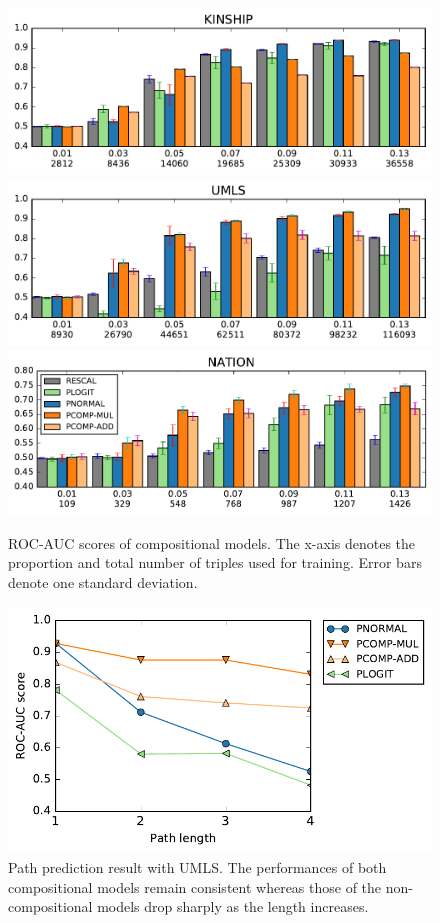 \begin{figure}[t]
	\centering
	\includegraphics[width=\linewidth]{images/comp_training_error_kinship_small.pdf}
	\includegraphics[width=\linewidth]{images/comp_training_error_umls_small.pdf}
	\includegraphics[width=\linewidth]{images/comp_training_error_nation_small.pdf}
	\caption{\label{fig:r_vs_br} ROC-AUC scores of compositional models.
	The x-axis denotes the proportion and total number of triples used for training. Error bars denote one standard deviation. %
}
\end{figure}

\begin{figure}[t]
	\centering
	\includegraphics[width=0.9\linewidth]{images/path_prediction2.pdf}
	\caption{\label{fig:path_pred} Path prediction result with UMLS.
	The performances of both compositional models remain consistent
	whereas those of the non-compositional models drop sharply as the length increases.}
\end{figure}


